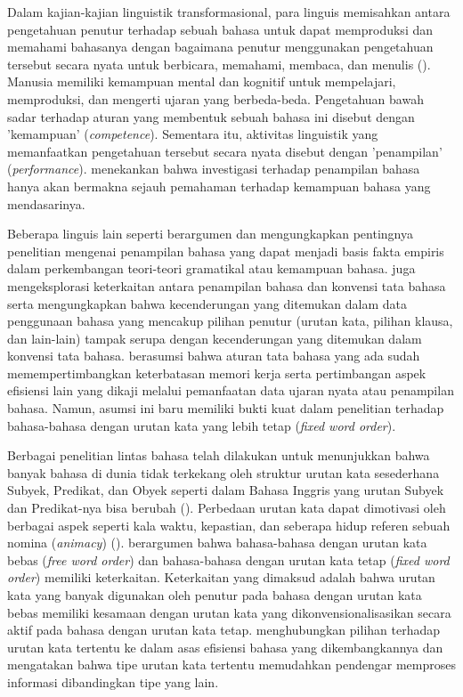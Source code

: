 Dalam kajian-kajian linguistik transformasional, para linguis memisahkan antara pengetahuan penutur terhadap sebuah bahasa untuk dapat memproduksi dan memahami bahasanya dengan bagaimana penutur menggunakan pengetahuan tersebut secara nyata untuk berbicara, memahami, membaca, dan menulis (\citealp{chomsky1965syntactic,delahuntygarvey2010soundsense}). Manusia memiliki kemampuan mental dan kognitif untuk mempelajari, memproduksi, dan mengerti ujaran yang berbeda-beda. Pengetahuan bawah sadar terhadap aturan yang membentuk sebuah bahasa ini disebut dengan 'kemampuan' (\textit{competence}). Sementara itu, aktivitas linguistik yang memanfaatkan pengetahuan tersebut secara nyata disebut dengan 'penampilan' (\textit{performance}). \cite{chomsky1965syntactic} menekankan bahwa investigasi terhadap penampilan bahasa hanya akan bermakna sejauh pemahaman terhadap kemampuan bahasa yang mendasarinya.

Beberapa linguis lain seperti \cite{sagwasow2011pccg} berargumen dan mengungkapkan pentingnya penelitian mengenai penampilan bahasa yang dapat menjadi basis fakta empiris dalam perkembangan teori-teori gramatikal atau kemampuan bahasa. \cite{hawkins2014cross} juga mengeksplorasi keterkaitan antara penampilan bahasa dan konvensi tata bahasa serta mengungkapkan bahwa kecenderungan yang ditemukan dalam data penggunaan bahasa yang mencakup pilihan penutur (urutan kata, pilihan klausa, dan lain-lain) tampak serupa dengan kecenderungan yang ditemukan dalam konvensi tata bahasa. \cite{hawkins2014cross} berasumsi bahwa aturan tata bahasa yang ada sudah memempertimbangkan keterbatasan memori kerja serta pertimbangan aspek efisiensi lain yang dikaji melalui pemanfaatan data ujaran nyata atau penampilan bahasa. Namun, asumsi ini baru memiliki bukti kuat dalam penelitian terhadap bahasa-bahasa dengan urutan kata yang lebih tetap (\textit{fixed word order}). 

Berbagai penelitian lintas bahasa telah dilakukan untuk menunjukkan bahwa banyak bahasa di dunia tidak terkekang oleh struktur urutan kata sesederhana Subyek, Predikat, dan Obyek seperti dalam Bahasa Inggris yang urutan Subyek dan Predikat-nya bisa berubah (\citealp{macwhinneybates1989cross, birnerward1998noncanonical, lambrecht2000info}). Perbedaan urutan kata dapat dimotivasi oleh berbagai aspek seperti kala waktu, kepastian, dan seberapa hidup referen sebuah nomina (\textit{animacy}) (\citealp{dryer1992greenbergian, tsunoda1995adpositions, polinskaja1989object}). \cite{hawkins1994performance} berargumen bahwa bahasa-bahasa dengan urutan kata bebas (\textit{free word order}) dan bahasa-bahasa dengan urutan kata tetap (\textit{fixed word order}) memiliki keterkaitan. Keterkaitan yang dimaksud adalah bahwa urutan kata yang banyak digunakan oleh penutur pada bahasa dengan urutan kata bebas memiliki kesamaan dengan urutan kata yang dikonvensionalisasikan secara aktif pada bahasa dengan urutan kata tetap. \cite{hawkins1994performance} menghubungkan pilihan terhadap urutan kata tertentu ke dalam asas efisiensi bahasa yang dikembangkannya dan mengatakan bahwa tipe urutan kata tertentu memudahkan pendengar memproses informasi dibandingkan tipe yang lain.

